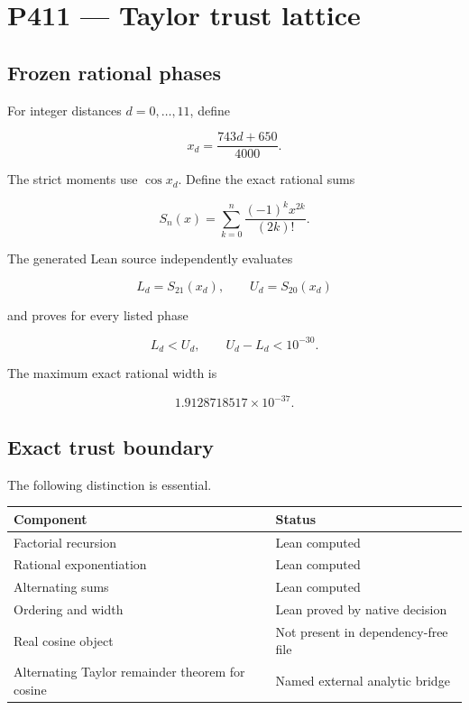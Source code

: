 \documentclass[11pt,a4paper,openany]{report}
\begin{document}
\chapter{P411 --- Taylor trust lattice}

\section{Frozen rational phases}

For integer distances \(d=0,\ldots,11\), define

\[
x_d=\frac{743d+650}{4000}.
\]

The strict moments use \(\cos x_d\). Define the exact rational sums

\[
S_n(x)=\sum_{k=0}^{n}\frac{(-1)^kx^{2k}}{(2k)!}.
\]

The generated Lean source independently evaluates

\[
L_d=S_{21}(x_d),
\qquad
U_d=S_{20}(x_d)
\]

and proves for every listed phase

\[
L_d<U_d,
\qquad
U_d-L_d<10^{-30}.
\]

The maximum exact rational width is

\[
1.9128718517\times10^{-37}.
\]

\section{Exact trust boundary}

The following distinction is essential.

\begin{center}
\begingroup\small
\setlength{\tabcolsep}{2.5pt}
\renewcommand{\arraystretch}{1.16}
\begin{longtable}{@{}p{}p{}@{}}
\toprule
\textbf{Component} & \textbf{Status} \\
\midrule
\endhead
Factorial recursion & Lean computed \\
Rational exponentiation & Lean computed \\
Alternating sums & Lean computed \\
Ordering and width & Lean proved by native decision \\
Real cosine object & Not present in dependency-free file \\
Alternating Taylor remainder theorem for cosine & Named external analytic bridge \\
\bottomrule
\end{longtable}
\endgroup
\end{center}
\end{document}

